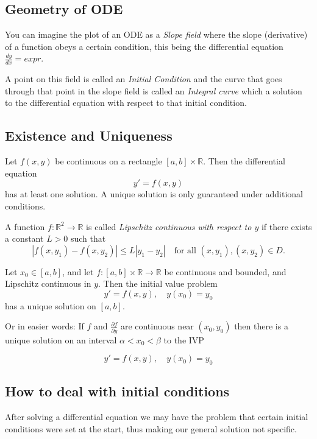 \subsection{Geometry of ODE}

You can imagine the plot of an ODE as a \emph{Slope field} where the slope (derivative) of a function
obeys a certain condition, this being the differential equation \(\frac{dy}{dx} = expr\).
\vspace{\baselineskip}

A point on this field is called an \emph{Initial Condition} and the curve that goes through
that point in the slope field is called an \emph{Integral curve} which a solution to the differential
equation with respect to that initial condition.


\subsection{Existence and Uniqueness}

Let \( f(x, y) \) be continuous on a rectangle \( [a, b] \times \mathbb{R} \). Then the differential equation
\[
y' = f(x, y)
\]
has at least one solution. A unique solution is only guaranteed under additional conditions.

A function \( f : \mathbb{R}^2 \to \mathbb{R} \) is called \emph{Lipschitz continuous with respect to \( y \)} if there exists a constant \( L > 0 \) such that
\[
|f(x, y_1) - f(x, y_2)| \leq L |y_1 - y_2|
\quad \text{for all } (x, y_1), (x, y_2) \in D.
\]

Let \( x_0 \in [a, b] \), and let \( f : [a, b] \times \mathbb{R} \to \mathbb{R} \) be continuous and bounded, and Lipschitz continuous in \( y \). Then the initial value problem
\[
y' = f(x, y), \quad y(x_0) = y_0
\]
has a unique solution on \( [a, b] \).
\vspace{\baselineskip}

Or in easier words: If \(f\) and \(\frac{\partial f}{\partial y}\) are continuous near \((x_0, y_0)\) then
there is a unique solution on an interval \(\alpha < x_0 < \beta\) to the IVP

\[y' = f(x,y), \quad y(x_0) = y_0\]

\subsection{How to deal with initial conditions}

After solving a differential equation we may have the problem that certain initial
conditions were set at the start, thus making our general solution not specific.
\vspace{\baselineskip}

